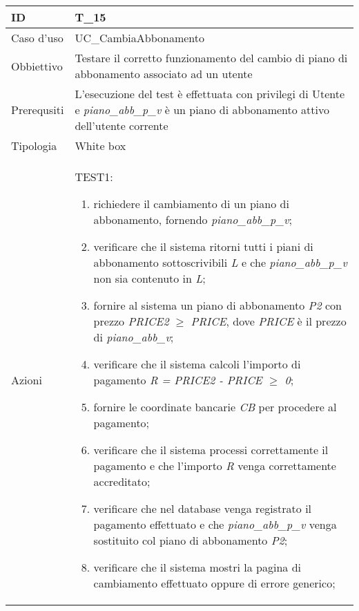 \begin{table}[hb]
    \centering
    \begin{tabular}{ |p{2cm}|p{10cm}|  }
        \hline
        ID          & T\_15                                                                                                                                   \\\hline
        Caso d'uso  & UC\_CambiaAbbonamento                                                                                                                   \\\hline
        Obbiettivo  & Testare il corretto funzionamento del cambio di piano di abbonamento associato ad un utente                                             \\\hline
        Prerequsiti & L'esecuzione del test è effettuata con privilegi di Utente e \emph{piano\_abb\_p\_v} è un piano di abbonamento attivo dell'utente corrente \\\hline
        Tipologia   & White box                                                                                                                               \\\hline
        Azioni      &
        TEST1:
        \begin{enumerate}[nosep, topsep=0pt]
            \item richiedere il cambiamento di un piano di abbonamento, fornendo \emph{piano\_abb\_p\_v};
            \item verificare che il sistema ritorni tutti i piani di abbonamento sottoscrivibili \emph{L} e che \emph{piano\_abb\_p\_v} non sia contenuto in \emph{L};
            \item fornire al sistema un piano di abbonamento \emph{P2} con prezzo \emph{PRICE2} $\geq$ \emph{PRICE}, dove \emph{PRICE} è il prezzo di \emph{piano\_abb\_v};
            \item verificare che il sistema calcoli l'importo di pagamento \emph{R = PRICE2 - PRICE $\geq$ 0};
            \item fornire le coordinate bancarie \emph{CB} per procedere al pagamento;
            \item verificare che il sistema processi correttamente il pagamento e che l'importo \emph{R} venga correttamente accreditato;
            \item verificare che nel database venga registrato il pagamento effettuato e che \emph{piano\_abb\_p\_v} venga sostituito col piano di abbonamento \emph{P2};
            \item verificare che il sistema mostri la pagina di cambiamento effettuato oppure di errore generico;

\end{enumerate}
\end{tabular}
\end{table}

